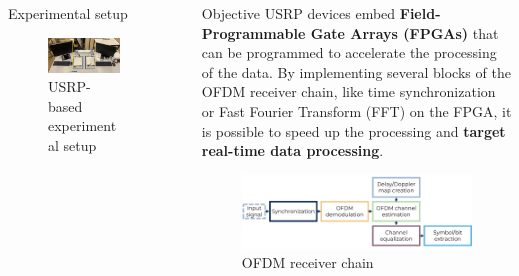 \documentclass[final]{beamer}
\newlength{\sepwid}
\newlength{\onecolwid}
\begin{document}
\begin{frame}[t,fragile]
\begin{columns}[t]
\begin{column}{\onecolwid}
\begin{block}{Experimental setup}
    \begin{figure}[!ht]
      \centering
      \includegraphics[width=\linewidth]{img/setup.pdf}
      \caption{USRP-based experimental setup}
    \end{figure}
  \end{block}

\end{column}

\begin{column}{\sepwid}\end{column} %

\begin{column}{\onecolwid}


  \begin{block}{Objective}
    USRP devices embed \textbf{Field-Programmable Gate Arrays (FPGAs)} that can be programmed to accelerate the processing of the data. 
    By implementing several blocks of the OFDM receiver chain, like time synchronization or Fast Fourier Transform (FFT) on the FPGA, it is possible to speed up the processing and \textbf{target real-time data processing}.


    \begin{figure}[!ht]
      \centering
      \includegraphics[width=\linewidth]{img/ofdm_reciever_chain_h.pdf}
      \caption{OFDM receiver chain}
    \end{figure}


\end{block}
\end{column}
\end{columns}
\end{frame}
\end{document}
